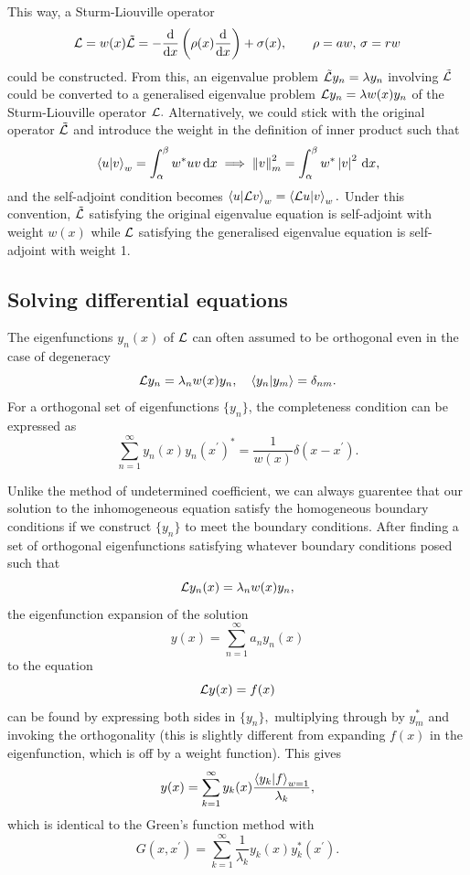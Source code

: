\documentclass{article}
\begin{document}
This way, a Sturm-Liouville operator
\[
    \mathcal{\MakeUppercase{L}} = w(x) \tilde{\mathcal{\MakeUppercase{L}} }
    = -\frac{\mathrm{d}}{\mathrm{d}x} \left( \rho (x) \frac{\mathrm{d}}{\mathrm{d}x} \right) + \sigma (x), \qquad 
    \rho = a w, \, \sigma  = r w 
\]
could be constructed. From this, an eigenvalue problem $\tilde{\mathcal{\MakeUppercase{L}} } y_n = \lambda y_n$ involving $\tilde{\mathcal{\MakeUppercase{L}} }$ could be converted to a generalised eigenvalue problem $\mathcal{\MakeUppercase{L}} y_n = \lambda w(x) y_n$ of the Sturm-Liouville operator $\mathcal{\MakeUppercase{L}}.$ Alternatively, we could stick with the original operator $\tilde{\mathcal{\MakeUppercase{L}}}$ and introduce the weight in the definition of inner product such that
\[
    \braket*{u}{v}_w = \int_{\alpha }^{\beta } w^* u v \,\mathrm{d}x 
    \implies \left\lVert v\right\rVert ^{2}_m = \int_{\alpha }^{\beta } w^* \left\vert v \right\vert ^{2}  \,\mathrm{d}x, 
\]
and the self-adjoint condition becomes 
\( 
    \braket{u}{\mathcal{\MakeUppercase{L}} v}_w = \braket{\mathcal{\MakeUppercase{L}} u}{v}_w.
\) 
Under this convention, $\tilde{\mathcal{\MakeUppercase{L}} }$ satisfying the original eigenvalue equation is self-adjoint with weight $w(x)$ while $\mathcal{\MakeUppercase{L}} $ satisfying the generalised eigenvalue equation is self-adjoint with weight 1. 

\subsection{Solving differential equations}
The eigenfunctions $y_n(x)$ of $\mathcal{\MakeUppercase{L}} $ can often assumed to be orthogonal even in the case of degeneracy
\[
    \mathcal{\MakeUppercase{L}} y_n = \lambda_n w(x) y_n, \quad 
    \braket{y_n}{y_m} = \delta_{nm}. 
\]
For a orthogonal set of eigenfunctions $\{y_n\}$, the completeness condition can be expressed as
\[
    \sum_{n=1}^{\infty} y_n(x) y_n(x^\prime )^{*} = \frac{1}{w(x)} \delta(x - x^\prime). 
\]

Unlike the method of undetermined coefficient, we can always guarentee that our solution to the inhomogeneous equation satisfy the homogeneous boundary conditions if we construct $\{y_n\}$ to meet the boundary conditions. After finding a set of orthogonal eigenfunctions satisfying whatever boundary conditions posed such that
\[
    \mathcal{\MakeUppercase{L}} y_n(x) = \lambda_n w(x) y_n,
\]
the eigenfunction expansion of the solution
\[
    y(x) = \sum_{n=1}^{\infty} a_n y_n(x)
\]
to the equation 
\[
    \mathcal{\MakeUppercase{L}} y(x) = f(x)
\]
can be found by expressing both sides in $\{y_n\},$ multiplying through by $y_m^*$ and invoking the orthogonality (this is slightly different from expanding $f(x)$ in the eigenfunction, which is off by a weight function). This gives
\[
    y(x) = \sum_{k=1}^{\infty} y_k(x) \frac{\braket{y_k}{f}_{w=1}}{\lambda_k},
\]
which is identical to the Green's function method with 
\[
    G(x, x^\prime ) = \sum_{k=1}^{\infty} \frac{1}{\lambda_k} y_k(x) y_k^*(x^\prime ). 
\]
\end{document}
